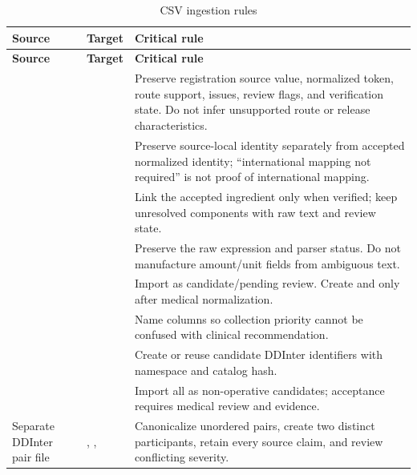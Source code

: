 \begin{longtable}{L{4.0cm}L{4.2cm}L{7.0cm}}
\caption{CSV ingestion rules}\label{tab:csv-mapping-rules}\\
\toprule
\textbf{Source} & \textbf{Target} & \textbf{Critical rule}\\
\midrule
\endfirsthead
\toprule
\textbf{Source} & \textbf{Target} & \textbf{Critical rule}\\
\midrule
\endhead
{} &  & Preserve registration source value, normalized token, route support, issues, review flags, and verification state. Do not infer unsupported route or release characteristics.\\
 &  & Preserve source-local identity separately from accepted normalized identity; ``international mapping not required'' is not proof of international mapping.\\
 &  & Link the accepted ingredient only when verified; keep unresolved components with raw text and review state.\\
 &  & Preserve the raw expression and parser status. Do not manufacture amount/unit fields from ambiguous text.\\
 &  & Import as candidate/pending review. Create  and  only after medical normalization.\\
 &  & Name columns so collection priority cannot be confused with clinical recommendation.\\
 &  & Create or reuse candidate DDInter identifiers with namespace and catalog hash.\\
 &  & Import all as non-operative candidates; acceptance requires medical review and evidence.\\
Separate DDInter pair file & , ,  & Canonicalize unordered pairs, create two distinct participants, retain every source claim, and review conflicting severity.\\
\bottomrule
\end{longtable}

